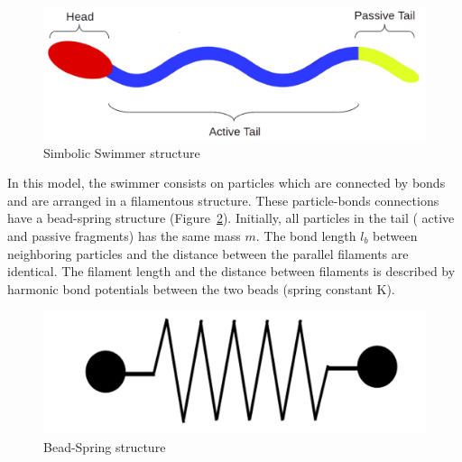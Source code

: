 \begin{figure}[ht]
  \centering
  \begin{footnotesize}
  \includegraphics[scale=0.25]{images/swimmer-struc.png}
  \caption[Simbolic Swimmer Structure]{Simbolic Swimmer structure}
  \label{fig:Bild1}
  \end{footnotesize}
\end{figure} 


In this model, the swimmer consists on particles which are connected by bonds and are arranged in a filamentous structure. These particle-bonds connections have a bead-spring 
structure (Figure~\ref{fig:Bild2.4}). Initially, all particles in the tail ( active and passive fragments) has the same mass $m$. The bond length $l_{b}$ between neighboring
particles and the distance between the parallel filaments are identical. The filament length and the distance between filaments is described by harmonic bond potentials between
the two beads (spring constant K).\par

\begin{figure}[ht]
\centering
  \begin{footnotesize}
  \includegraphics[scale=0.15]{images/bead-spring.png}
  \caption[Bead-Spring Structure]{Bead-Spring structure}
  \label{fig:Bild2.4}
  \end{footnotesize}
\end{figure} 

